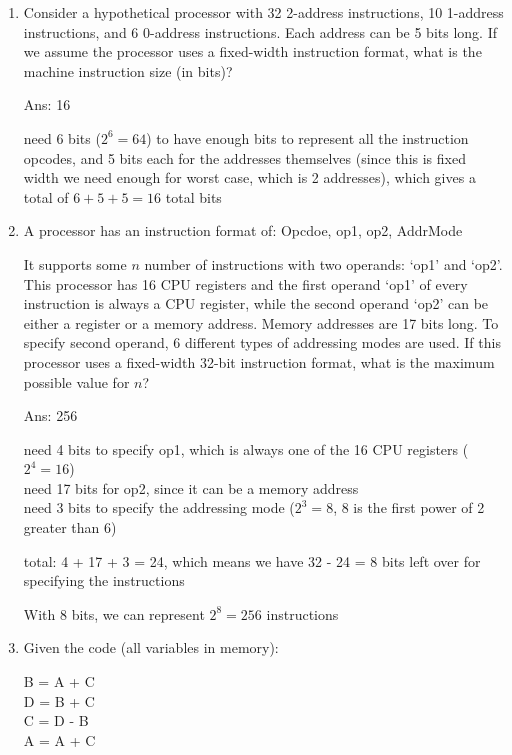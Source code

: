 \documentclass[12pt]{article}
\begin{document}
\begin{enumerate}
        \item Consider a hypothetical processor with 32 2-address instructions, 10 1-address instructions, and 6 0-address 
        instructions. Each address can be 5 bits long. If we assume the processor uses a fixed-width instruction format, 
        what is the machine instruction size (in bits)?

        Ans: 16

        need 6 bits ($2^6 = 64$) to have enough bits to represent all the instruction opcodes, and 5 bits each for the 
        addresses themselves (since this is fixed width we need enough for worst case, which is 2 addresses), which gives 
        a total of $6 + 5 + 5 = 16$ total bits

        \item A processor has an instruction format of: Opcdoe, op1, op2, AddrMode
        
        It supports some $n$ number of instructions with two operands: `op1' and `op2'. This processor has 16 CPU 
        registers and the first operand `op1' of every instruction is always a CPU register, while the second operand 
        `op2' can be either a register or a memory address. Memory addresses are 17 bits long. To specify second operand, 
        6 different types of addressing modes are used. If this processor uses a fixed-width 32-bit instruction format, 
        what is the maximum possible value for $n$?

        Ans: 256

        need 4 bits to specify op1, which is always one of the 16 CPU registers ($2^4 = 16$)\\
        need 17 bits for op2, since it can be a memory address\\
        need 3 bits to specify the addressing mode ($2^3 = 8$, 8 is the first power of 2 greater than 6)

        total: 4 + 17 + 3 = 24, which means we have 32 - 24 = 8 bits left over for specifying the instructions

        With 8 bits, we can represent $2^8 = 256$ instructions

        \item Given the code (all variables in memory):
        
        B = A + C\\
        D = B + C\\
        C = D - B\\
        A = A + C\\


\end{enumerate}
\end{document}
